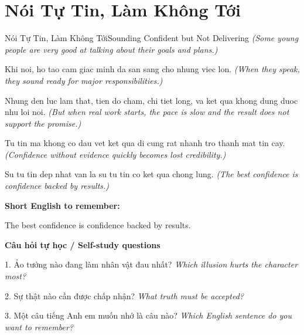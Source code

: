 \section{Nói Tự Tin, Làm Không Tới}
\begin{truyen}{Nói Tự Tin, Làm Không Tới}{Sounding Confident but Not Delivering}
\textit{(Some young people are very good at talking about their goals and plans.)}

Khi noi, ho tao cam giac minh da san sang cho nhung viec lon.
\textit{(When they speak, they sound ready for major responsibilities.)}

Nhung den luc lam that, tien do cham, chi tiet long, va ket qua khong dung duoc nhu loi noi.
\textit{(But when real work starts, the pace is slow and the result does not support the promise.)}

Tu tin ma khong co dau vet ket qua di cung rat nhanh tro thanh mat tin cay.
\textit{(Confidence without evidence quickly becomes lost credibility.)}

\end{truyen}

\begin{baihoc}
Su tu tin dep nhat van la su tu tin co ket qua chong lung.
\textit{(The best confidence is confidence backed by results.)}
\end{baihoc}

\begin{ghinhoanh}
\textbf{Short English to remember:}

The best confidence is confidence backed by results.

\end{ghinhoanh}

\begin{tuhocnhanh}
\textbf{Câu hỏi tự học / Self-study questions}

1. Ảo tưởng nào đang làm nhân vật đau nhất? \textit{Which illusion hurts the character most?}

2. Sự thật nào cần được chấp nhận? \textit{What truth must be accepted?}

3. Một câu tiếng Anh em muốn nhớ là câu nào? \textit{Which English sentence do you want to remember?}
\end{tuhocnhanh}
\ngancach

